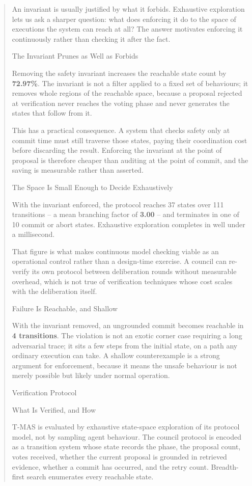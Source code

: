 \documentclass{article}
\begin{document}
\begin{quote}
{An invariant is usually justified by what it forbids. Exhaustive exploration lets
us ask a sharper question: what does enforcing it do to the space of executions the
system can reach at all? The answer motivates enforcing it continuously rather than
checking it after the fact.

 The Invariant Prunes as Well as Forbids

Removing the safety invariant increases the reachable state count by
\textbf{72.97\%}. The invariant is not a filter
applied to a fixed set of behaviours; it removes whole regions of the reachable
space, because a proposal rejected at verification never reaches the voting phase
and never generates the states that follow from it.

This has a practical consequence. A system that checks safety only at commit time
must still traverse those states, paying their coordination cost before discarding
the result. Enforcing the invariant at the point of proposal is therefore cheaper
than auditing at the point of commit, and the saving is measurable rather than
asserted.

 The Space Is Small Enough to Decide Exhaustively

With the invariant enforced, the protocol reaches
37 states over 111
transitions -- a mean branching factor of
\textbf{3.00} -- and terminates in one of
10 commit or abort states. Exhaustive exploration
completes in well under a millisecond.

That figure is what makes continuous model checking viable as an operational
control rather than a design-time exercise. A council can re-verify its own
protocol between deliberation rounds without measurable overhead, which is not true
of verification techniques whose cost scales with the deliberation itself.

 Failure Is Reachable, and Shallow

With the invariant removed, an ungrounded commit becomes reachable in
\textbf{4 transitions}. The violation is
not an exotic corner case requiring a long adversarial trace; it sits a few steps
from the initial state, on a path any ordinary execution can take. A shallow
counterexample is a strong argument for enforcement, because it means the unsafe
behaviour is not merely possible but likely under normal operation.



 Verification Protocol

 What Is Verified, and How

T-MAS is evaluated by exhaustive state-space exploration of its protocol model, not by sampling agent behaviour. The council protocol is encoded as a transition system whose state records the phase, the proposal count, votes received, whether the current proposal is grounded in retrieved evidence, whether a commit has occurred, and the retry count. Breadth-first search enumerates every reachable state.

}
\end{quote}
\end{document}
